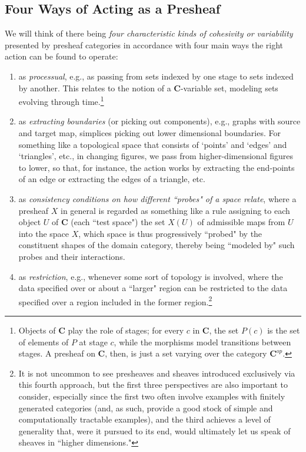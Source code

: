 \documentclass[11pt]{book}
\theoremstyle{definition}
\theoremstyle{definition}
\theoremstyle{definition}
\theoremstyle{theorem}
\theoremstyle{definition}
\begin{document}
\subsection{Four Ways of Acting as a Presheaf} 
We will think of there being \textit{four characteristic kinds of cohesivity or variability} presented by presheaf categories in accordance with four main ways the right action can be found to operate:
\begin{enumerate}  
\item as \textit{processual}, e.g., as passing from sets indexed by one stage to sets indexed by another. This relates to the notion of a \textbf{C}-variable set, modeling sets evolving through time.\footnote{{Objects of \textbf{C} play the role of stages; for every $c$ in \textbf{C}, the set $P(c)$ is the set of elements of $P$ at stage $c$, while the morphisms model transitions between stages. A presheaf on \textbf{C}, then, is just a set varying over the category $\textbf{C}^{op}$.}} 
\item as \textit{extracting boundaries} (or picking out components), e.g., graphs with source and target map, simplices picking out lower dimensional boundaries. For something like a topological space that consists of `points' and `edges' and `triangles', etc., in changing figures, we pass from higher-dimensional figures to lower, so that, for instance, the action works by extracting the end-points of an edge or extracting the edges of a triangle, etc.   
\item as \textit{consistency conditions on how different ``probes" of a space relate}, where a presheaf $X$ in general is regarded as something like a rule assigning to each object $U$ of $\textbf{C}$ (each ``test space") the set $X(U)$ of admissible maps from $U$ into the space $X$, which space is thus progressively ``probed" by the constituent shapes of the domain category, thereby being ``modeled by" such probes and their interactions.     
\item as \textit{restriction}, e.g., whenever some sort of topology is involved, where the data specified over or about a ``larger" region can be restricted to the data specified over a region included in the former region.\footnote{It is not uncommon to see presheaves and sheaves introduced exclusively via this fourth approach, but the first three perspectives are also important to consider, especially since the first two often involve examples with finitely generated categories (and, as such, provide a good stock of simple and computationally tractable examples), and the third achieves a level of generality that, were it pursued to its end, would ultimately let us speak of sheaves in ``higher dimensions."} 
\end{enumerate} 
\end{document}
